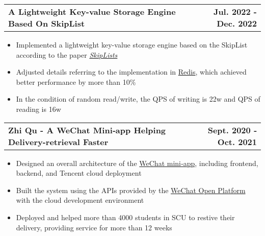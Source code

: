 \documentclass[letterpaper,11pt]{article}
\makeatletter
\newcommand{\resumeItem}[1]{
  \item\small{
    {#1 \vspace{-2pt}}
  }
}
\newcommand{\resumeProjectHeading}[2]{
    \item
    \begin{tabular*}{1.001\textwidth}{l@{\extracolsep{\fill}}r}
      \small#1 & \textbf{\small #2}\\
    \end{tabular*}\vspace{-7pt}
}
\newcommand{\resumeItemListStart}{\begin{itemize}}
\newcommand{\resumeItemListEnd}{\end{itemize}\vspace{-5pt}}
\makeatother
\begin{document}
    \resumeProjectHeading
          {\textbf{A Lightweight Key-value Storage Engine Based On SkipList}}{Jul. 2022 - Dec. 2022}
          \resumeItemListStart
            \resumeItem{Implemented a lightweight key-value storage engine based on the SkipList according to the paper \textit{\href{https://15721.courses.cs.cmu.edu/spring2018/papers/08-oltpindexes1/pugh-skiplists-cacm1990.pdf}{SkipLists}}}
            \resumeItem{Adjusted details referring to the implementation in \href{https://redis.io/}{Redis}, which achieved better performance by more than 10\% }
            \resumeItem{In the condition of random read/write, the QPS of writing is 22w and QPS of reading is 16w}
          \resumeItemListEnd 
          \vspace{-19pt}

      \resumeProjectHeading
          {\textbf{Zhi Qu - A WeChat Mini‑app Helping Delivery-retrieval Faster}}{Sept. 2020 ‑ Oct. 2021}
          \resumeItemListStart
            \resumeItem{Designed an overall architecture of the \href{https://developers.weixin.qq.com/miniprogram/en/dev/framework/quickstart/}{WeChat mini‑app}, including frontend, backend, and Tencent  cloud deployment}
            \resumeItem{Built the system using the APIs provided by the \href{https://open.weixin.qq.com/?lang=en}{WeChat Open Platform} with the cloud development environment}
            \resumeItem{Deployed and helped more than 4000 students in SCU to restive their delivery, providing service for more than 12 weeks}
          \resumeItemListEnd

    
\end{document}
